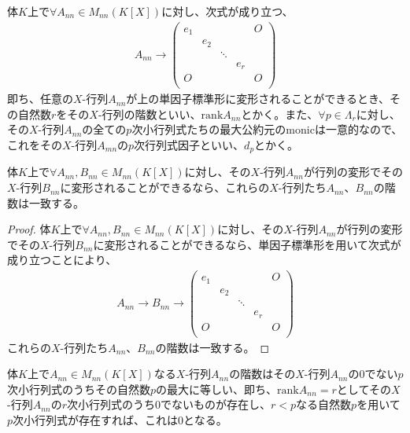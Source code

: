 \documentclass[dvipdfmx]{jsarticle}
\begin{document}
\begin{dfn}
体$K$上で$\forall A_{nn} \in M_{nn}\left( K[ X] \right)$に対し、次式が成り立つ、
\begin{align*}
A_{nn} \rightarrow \begin{pmatrix}
e_{1} & \  & \  & \  & O \\
\  & e_{2} & \  & \  & \  \\
\  & \  & \ddots & \  & \  \\
\  & \  & \  & e_{r} & \  \\
O & \  & \  & \  & O \\
\end{pmatrix}
\end{align*}
即ち、任意の$X$-行列$A_{nn}$が上の単因子標準形に変形されることができるとき、その自然数$r$をその$X$-行列の階数といい、${\mathrm{rank}}{A_{nn}}$とかく。また、$\forall p \in \varLambda_{r}$に対し、その$X$-行列$A_{nn}$の全ての$p$次小行列式たちの最大公約元のmonicは一意的なので、これをその$X$-行列$A_{mn}$の$p$次行列式因子といい、$d_{p}$とかく。
\end{dfn}
\begin{thm}\label{2.2.8.3}
体$K$上で$\forall A_{nn},B_{nn} \in M_{nn}\left( K[ X] \right)$に対し、その$X$-行列$A_{nn}$が行列の変形でその$X$-行列$B_{nn}$に変形されることができるなら、これらの$X$-行列たち$A_{nn}$、$B_{nn}$の階数は一致する。
\end{thm}
\begin{proof}
体$K$上で$\forall A_{nn},B_{nn} \in M_{nn}\left( K[ X] \right)$に対し、その$X$-行列$A_{nn}$が行列の変形でその$X$-行列$B_{nn}$に変形されることができるなら、単因子標準形を用いて次式が成り立つことにより、
\begin{align*}
A_{nn} \rightarrow B_{nn} \rightarrow \begin{pmatrix}
e_{1} & \  & \  & \  & O \\
\  & e_{2} & \  & \  & \  \\
\  & \  & \ddots & \  & \  \\
\  & \  & \  & e_{r} & \  \\
O & \  & \  & \  & O \\
\end{pmatrix}
\end{align*}
これらの$X$-行列たち$A_{nn}$、$B_{nn}$の階数は一致する。
\end{proof}
\begin{thm}\label{2.2.8.4}
体$K$上で$A_{nn} \in M_{nn}\left( K[ X] \right)$なる$X$-行列$A_{nn}$の階数はその$X$-行列$A_{nn}$の$0$でない$p$次小行列式のうちその自然数$p$の最大に等しい、即ち、${\mathrm{rank}}{A_{nn}} = r$としてその$X$-行列$A_{nn}$の$r$次小行列式のうち$0$でないものが存在し、$r < p$なる自然数$p$を用いて$p$次小行列式が存在すれば、これは$0$となる。
\end{thm}
\end{document}
